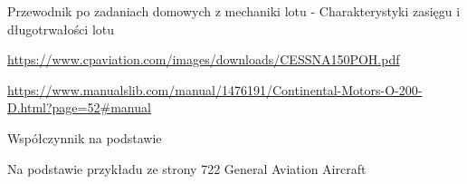 \documentclass[a4paper, twoside]{report}
\begin{document}
\begin{thebibliography}

\bibitem{}Przewodnik  po zadaniach domowych z mechaniki lotu - Charakterystyki zasięgu i długotrwałości lotu

\href{}{https://www.cpaviation.com/images/downloads/CESSNA150POH.pdf}

\href{}{https://www.manualslib.com/manual/1476191/Continental-Motors-O-200-D.html?page=52#manual}

 Współczynnik na podstawie \href{}{}

Na podstawie przykładu ze strony 722 General Aviation Aircraft


\end{thebibliography}
\end{document}
